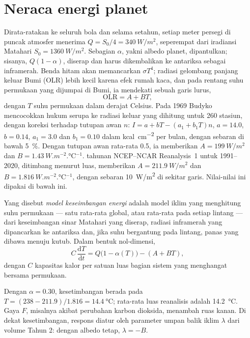 \section{Neraca energi planet}\label{sec:b3:climate-models:zero-d}

Dirata-ratakan ke seluruh bola dan selama setahun, setiap meter persegi di puncak
atmosfer menerima $Q = S_0/4 = \qty{340}{W/m^2}$, seperempat dari
iradiansi Matahari $S_0 = \qty{1360}{W/m^2}$. Sebagian $\alpha$, yakni
albedo planet, dipantulkan; sisanya, $Q(1 - \alpha)$, diserap dan
harus dikembalikan ke antariksa sebagai inframerah. Benda hitam akan memancarkan $\sigma
T^4$; radiasi gelombang panjang keluar Bumi (OLR) lebih kecil karena
efek rumah kaca, dan pada rentang suhu permukaan yang dijumpai di
Bumi, ia mendekati sebuah garis lurus,
\[
\text{OLR} = A + BT ,
\]
dengan $T$ suhu permukaan dalam derajat Celsius. Pada 1969 Budyko mencocokkan
hukum serupa ke radiasi keluar yang dihitung untuk 260 stasiun, dengan koreksi terhadap
tutupan awan $n$: $I = a + bT - (a_1 + b_1T)n$, $a = 14.0$, $b = 0.14$, $a_1 =
3.0$ dan $b_1 = 0.10$ dalam \unit{kcal.cm^{-2}} per bulan, dengan sebaran di bawah
\qty{5}{\percent}. Dengan tutupan awan rata-rata 0.5, ia memberikan $A =
\qty{199}{W/m^2}$ dan $B = \qty{1.43}{W.m^{-2}.\celsius^{-1}}$. 
tahunan NCEP--NCAR Reanalysis~1 untuk 1991--2020, ditimbang menurut luas,
memberikan $A = \qty{211.9}{W/m^2}$ dan $B = \qty{1.816}{W.m^{-2}.\celsius^{-1}}$,
dengan sebaran \qty{10}{W/m^2} di sekitar garis. Nilai-nilai ini dipakai
di bawah ini.

\begin{definition}\label{def:b3:climate-models:ebm}
Yang disebut \emph{model keseimbangan energi} adalah model iklim
yang menghitung suhu permukaan --- satu rata-rata global, atau
rata-rata pada setiap lintang --- dari keseimbangan sinar Matahari yang diserap, radiasi
inframerah yang dipancarkan ke antariksa dan, jika suhu bergantung pada lintang, panas
yang dibawa menuju kutub. Dalam bentuk nol-dimensi,
\[
C\,\frac{\mathrm dT}{\mathrm dt} = Q\big(1 - \alpha(T)\big) - (A + BT) ,
\]
dengan $C$ kapasitas kalor per satuan luas bagian sistem yang
menghangat bersama permukaan.
\end{definition}

Dengan $\alpha = 0.30$, kesetimbangan berada pada $T = (238 - 211.9)/1.816 =
\qty{14.4}{\celsius}$; rata-rata luas reanalisis adalah
\qty{14.2}{\celsius}. Gaya $F$, misalnya akibat perubahan karbon
dioksida, menambah ruas kanan. Di dekat kesetimbangan, respons
diatur oleh parameter umpan balik iklim $\lambda$ dari volume Tahun 2:
dengan albedo tetap, $\lambda = -B$.


